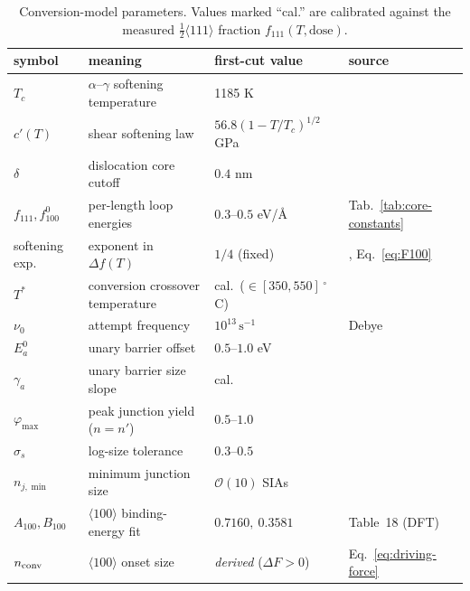 \begin{table}[ht]
\centering
\caption{Conversion-model parameters.  Values marked ``cal.'' are calibrated
against the measured $\tfrac12\langle111\rangle$ fraction $f_{111}(T,\text{dose})$.}
\label{tab:conversion-params}
\begin{tabular}{llll}
\toprule
symbol & meaning & first-cut value & source \\
\midrule
$T_c$            & $\alpha$--$\gamma$ softening temperature & 1185 K & \citet{Dudarev2008} \\
$c'(T)$          & shear softening law & $56.8(1{-}T/T_c)^{1/2}$ GPa & \citet{Dudarev2008} \\
$\delta$         & dislocation core cutoff & $0.4$ nm & \citet{Dudarev2008} \\
$f_{111},f_{100}^{0}$ & per-length loop energies & $0.3$--$0.5$ eV/\AA & Tab.~\ref{tab:core-constants} \\
softening exp.   & exponent in $\Delta f(T)$ & $1/4$ (fixed) & \citet{Dudarev2008}, Eq.~\eqref{eq:F100} \\
$T^\ast$         & conversion crossover temperature & cal.\ ($\in[350,550]\,^\circ$C) & \citet{Dudarev2008} \\
$\nu_0$          & attempt frequency & $10^{13}\,\mathrm{s}^{-1}$ & Debye \\
$E_a^{0}$        & unary barrier offset & $0.5$--$1.0$ eV & \citet{Marian2002} \\
$\gamma_a$       & unary barrier size slope & cal. & \citet{Arakawa2006} \\
$\varphi_{\max}$ & peak junction yield ($n{=}n'$) & $0.5$--$1.0$ & \citet{Marian2002} \\
$\sigma_s$       & log-size tolerance & $0.3$--$0.5$ & \citet{Marian2002} \\
$n_{j,\min}$     & minimum junction size & $\mathcal O(10)$ SIAs & \citet{Marian2002} \\
$A_{100},B_{100}$& $\langle100\rangle$ binding-energy fit & $0.7160,\ 0.3581$ & Table~18 (DFT) \\
$n_{\rm conv}$   & $\langle100\rangle$ onset size & \emph{derived} ($\Delta F{>}0$) & Eq.~\eqref{eq:driving-force} \\
\bottomrule
\end{tabular}
\end{table}

% 
% 
